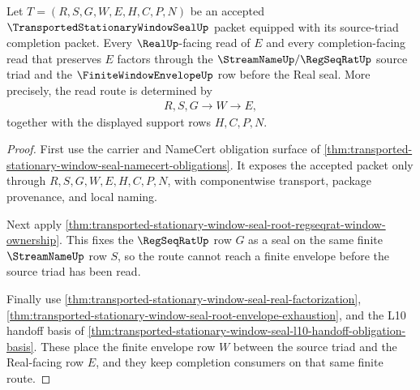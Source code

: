 \begin{theorem}
\label{thm:transported-stationary-window-seal-envelope-realup-totality}
Let $T=(R,S,G,W,E,H,C,P,N)$ be an accepted $\TransportedStationaryWindowSealUp$ packet equipped with its source-triad completion packet. Every $\RealUp$-facing read of $E$ and every completion-facing read that preserves $E$ factors through the $\StreamNameUp/\RegSeqRatUp$ source triad and the $\FiniteWindowEnvelopeUp$ row before the Real seal. More precisely, the read route is determined by
$$
\begin{aligned}
  R,S,G
  \longrightarrow
  W
  \longrightarrow
  E ,
\end{aligned}
$$
together with the displayed support rows $H,C,P,N$.
\end{theorem}
\begin{proof}
First use the carrier and NameCert obligation surface of \autoref{thm:transported-stationary-window-seal-namecert-obligations}. It exposes the accepted packet only through $R,S,G,W,E,H,C,P,N$, with componentwise transport, package provenance, and local naming.

Next apply \autoref{thm:transported-stationary-window-seal-root-regseqrat-window-ownership}. This fixes the $\RegSeqRatUp$ row $G$ as a seal on the same finite $\StreamNameUp$ row $S$, so the route cannot reach a finite envelope before the source triad has been read.

Finally use \autoref{thm:transported-stationary-window-seal-real-factorization}, \autoref{thm:transported-stationary-window-seal-root-envelope-exhaustion}, and the L10 handoff basis of \autoref{thm:transported-stationary-window-seal-l10-handoff-obligation-basis}. These place the finite envelope row $W$ between the source triad and the Real-facing row $E$, and they keep completion consumers on that same finite route.
\end{proof}

